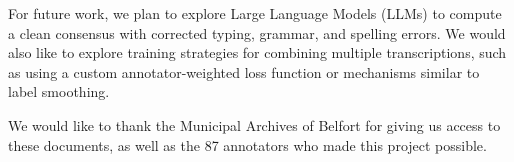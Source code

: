\documentclass[sigconf]{acmart}
\begin{document}
For future work, we plan to explore Large Language Models (LLMs) to compute a clean consensus with corrected typing, grammar, and spelling errors. We would also like to explore training strategies for combining multiple transcriptions, such as using a custom annotator-weighted loss function or mechanisms similar to label smoothing.












\begin{acks}
We would like to thank the Municipal Archives of Belfort for giving us access to these documents, as well as the 87 annotators who made this project possible.
\end{acks}



\end{document}
